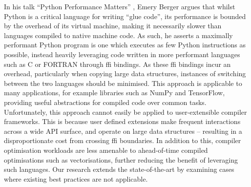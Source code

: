 In his talk ``Python Performance Matters'' \cite{emerybergerPythonPerformanceMatters2022}, Emery Berger argues that whilst Python is a critical language for writing ``glue code'', its performance is bounded by the overhead of its virtual machine, making it necessarily slower than languages compiled to native machine code.
As such, he asserts a maximally performant Python program is one which executes as few Python instructions as possible, instead heavily leveraging code written in more performant languages such as C or FORTRAN through \ac{ffi} bindings.
As these \ac{ffi} bindings incur an overhead, particularly when copying large data structures, instances of switching between the two languages should be minimised.
This approach is applicable to many applications, for example libraries such as NumPy and TensorFlow, providing useful abstractions for compiled code over common tasks.
Unfortunately, this approach cannot easily be applied to user-extensible compiler frameworks. This is because user defined extensions make frequent interactions across a wide API surface, and operate on large data structures -- resulting in a disproportionate cost from crossing \ac{ffi} boundaries.
In addition to this, compiler optimisation workloads are less amenable to ahead-of-time compiled optimisations such as vectorisations, further reducing the benefit of leveraging such languages.
Our research extends the state-of-the-art by examining cases where existing best practices are not applicable.


